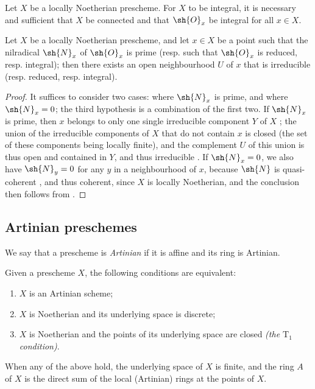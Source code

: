 \begin{corollary}[6.1.12]
\label{I.6.1.12}
Let $X$ be a locally Noetherian prescheme.
For $X$ to be integral, it is necessary and sufficient that $X$ be connected and that $\sh{O}_x$ be integral for all $x\in X$.
\end{corollary}

\begin{proposition}[6.1.13]
\label{I.6.1.13}
Let $X$ be a locally Noetherian prescheme, and let $x\in X$ be a point such that the nilradical $\sh{N}_x$ of $\sh{O}_x$ is prime (resp. such that $\sh{O}_x$ is reduced, resp. integral);
then there exists an open neighbourhood $U$ of $x$ that is irreducible (resp. reduced, resp. integral).
\end{proposition}

\begin{proof}
It suffices to consider two cases: where $\sh{N}_x$ is prime, and where $\sh{N}_x=0$; the third hypothesis is a combination of the first two.
If $\sh{N}_x$ is prime, then $x$ belongs to only one single irreducible component $Y$ of $X$ ;
the union of the irreducible components of $X$ that do not contain $x$ is closed (the set of these components being locally finite), and the complement $U$ of this union is thus open and contained in $Y$, and thus irreducible .
If $\sh{N}_x=0$, we also have $\sh{N}_y=0$ for any $y$ in a neighbourhood of $x$, because $\sh{N}$ is quasi-coherent , and thus coherent, since $X$ is locally Noetherian, and the conclusion then follows from .
\end{proof}

\subsection{Artinian preschemes}
\label{subsection:I.6.2}

\begin{definition}[6.2.1]
\label{I.6.2.1}
We say that a prescheme is \emph{Artinian} if it is affine and its ring is Artinian.
\end{definition}

\begin{proposition}[6.2.2]
\label{I.6.2.2}
Given
a prescheme $X$, the following conditions are equivalent:
\begin{enumerate}
  \item[{\rm(a)}] $X$ is an Artinian scheme;
  \item[{\rm(b)}] $X$ is Noetherian and its underlying space is discrete;
  \item[{\rm(c)}] $X$ is Noetherian and the points of its underlying space are closed \emph{(the $\mathrm{T}_1$ condition)}.
\end{enumerate}
When any of the above hold, the underlying space of $X$ is finite, and the ring $A$ of $X$ is the direct sum of the local (Artinian) rings at the points of $X$.
\end{proposition}

